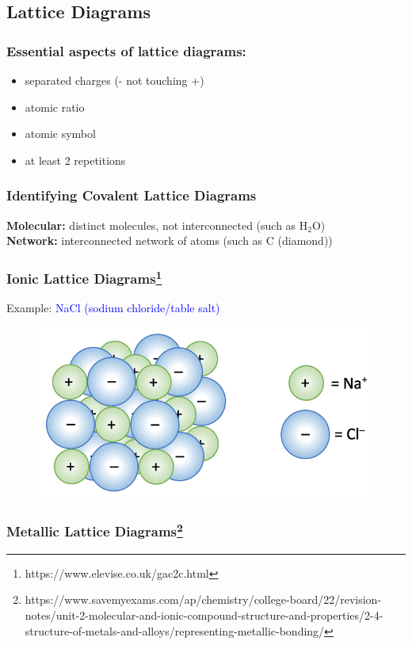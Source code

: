 \documentclass[a4paper, 12pt]{article}
\begin{document}
\subsection*{Lattice Diagrams}

\subsubsection*{Essential aspects of lattice diagrams:}
\begin{itemize}[leftmargin=*,nosep]
    \item separated charges (- not touching +)
    \item atomic ratio
    \item atomic symbol
    \item at least 2 repetitions
\end{itemize}

\subsubsection*{Identifying Covalent Lattice Diagrams}
\textbf{Molecular:} distinct molecules, not interconnected (such as H$_2$O)
\\
\textbf{Network:} interconnected network of atoms (such as C (diamond))

\subsubsection*{Ionic Lattice Diagrams\footnote{https://www.elevise.co.uk/gac2c.html}}

Example: \textcolor{blue}{NaCl (sodium chloride/table salt)}

\begin{figure}[ht]
    \centering
    \includegraphics[width=0.5\linewidth]{lattice.png} 
    \label{fig:1}
\end{figure} 

\subsubsection*{Metallic Lattice Diagrams\footnote{https://www.savemyexams.com/ap/chemistry/college-board/22/revision-notes/unit-2-molecular-and-ionic-compound-structure-and-properties/2-4-structure-of-metals-and-alloys/representing-metallic-bonding/}}
\end{document}
